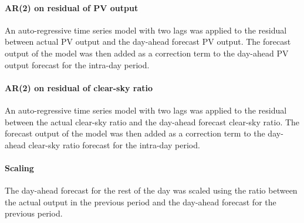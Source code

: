 \paragraph{AR(2) on residual of PV output}
An auto-regressive time series model with two lags was applied to the residual between actual PV output and the day-ahead forecast PV output. The forecast output of the model was then added as a correction term to the day-ahead PV output forecast for the intra-day period.

\paragraph{AR(2) on residual of clear-sky ratio}
An auto-regressive time series model with two lags was applied to the residual between the actual clear-sky ratio and the day-ahead forecast clear-sky ratio. The forecast output of the model was then added as a correction term to the day-ahead clear-sky ratio forecast for the intra-day period.

\paragraph{Scaling}
The day-ahead forecast for the rest of the day was scaled using the ratio between the actual output in the previous period and the day-ahead forecast for the previous period.

